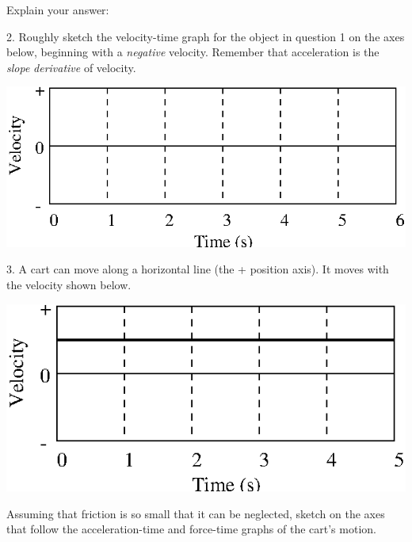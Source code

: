Explain your answer:
\vspace{10mm}

2. Roughly sketch the velocity-time graph for the object in question 1 on the
axes below, beginning with a \textit{negative} velocity.  Remember that acceleration 
is the 
\ifForOneTwentyFive
   \textit{slope} 
\else
   \textit{derivative} 
\fi
of velocity.

\vspace{0.3cm}
{\par\centering \includegraphics{force1/force1_fig7.eps} \par}
\vspace{0.3cm}

3. A cart can move along a horizontal line (the + position axis). It moves with
the velocity shown below.

\vspace{0.3cm}
{\par\centering \includegraphics{force1/force1_fig8.eps} \par}
\vspace{0.3cm}

\pagebreak[2]
Assuming that friction is so small that it can be neglected, sketch on the axes
that follow the acceleration-time and force-time graphs of the cart's motion.

